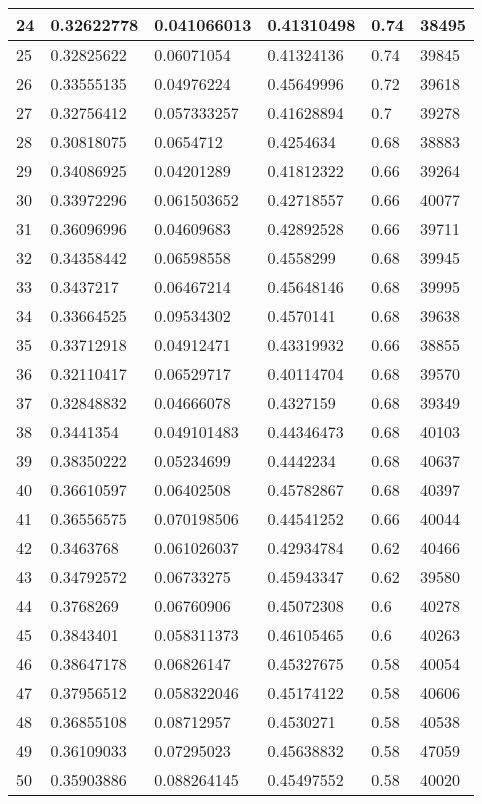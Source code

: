 \begin{longtable}{|l|l|l|l|l|l|}
24 & 0.32622778 & 0.041066013 & 0.41310498 & 0.74 & 38495 \\ \hline 
25 & 0.32825622 & 0.06071054 & 0.41324136 & 0.74 & 39845 \\ \hline 
26 & 0.33555135 & 0.04976224 & 0.45649996 & 0.72 & 39618 \\ \hline 
27 & 0.32756412 & 0.057333257 & 0.41628894 & 0.7 & 39278 \\ \hline 
28 & 0.30818075 & 0.0654712 & 0.4254634 & 0.68 & 38883 \\ \hline 
29 & 0.34086925 & 0.04201289 & 0.41812322 & 0.66 & 39264 \\ \hline 
30 & 0.33972296 & 0.061503652 & 0.42718557 & 0.66 & 40077 \\ \hline 
31 & 0.36096996 & 0.04609683 & 0.42892528 & 0.66 & 39711 \\ \hline 
32 & 0.34358442 & 0.06598558 & 0.4558299 & 0.68 & 39945 \\ \hline 
33 & 0.3437217 & 0.06467214 & 0.45648146 & 0.68 & 39995 \\ \hline 
34 & 0.33664525 & 0.09534302 & 0.4570141 & 0.68 & 39638 \\ \hline 
35 & 0.33712918 & 0.04912471 & 0.43319932 & 0.66 & 38855 \\ \hline 
36 & 0.32110417 & 0.06529717 & 0.40114704 & 0.68 & 39570 \\ \hline 
37 & 0.32848832 & 0.04666078 & 0.4327159 & 0.68 & 39349 \\ \hline 
38 & 0.3441354 & 0.049101483 & 0.44346473 & 0.68 & 40103 \\ \hline 
39 & 0.38350222 & 0.05234699 & 0.4442234 & 0.68 & 40637 \\ \hline 
40 & 0.36610597 & 0.06402508 & 0.45782867 & 0.68 & 40397 \\ \hline 
41 & 0.36556575 & 0.070198506 & 0.44541252 & 0.66 & 40044 \\ \hline 
42 & 0.3463768 & 0.061026037 & 0.42934784 & 0.62 & 40466 \\ \hline 
43 & 0.34792572 & 0.06733275 & 0.45943347 & 0.62 & 39580 \\ \hline 
44 & 0.3768269 & 0.06760906 & 0.45072308 & 0.6 & 40278 \\ \hline 
45 & 0.3843401 & 0.058311373 & 0.46105465 & 0.6 & 40263 \\ \hline 
46 & 0.38647178 & 0.06826147 & 0.45327675 & 0.58 & 40054 \\ \hline 
47 & 0.37956512 & 0.058322046 & 0.45174122 & 0.58 & 40606 \\ \hline 
48 & 0.36855108 & 0.08712957 & 0.4530271 & 0.58 & 40538 \\ \hline 
49 & 0.36109033 & 0.07295023 & 0.45638832 & 0.58 & 47059 \\ \hline 
50 & 0.35903886 & 0.088264145 & 0.45497552 & 0.58 & 40020 \\ \hline 
\end{longtable}